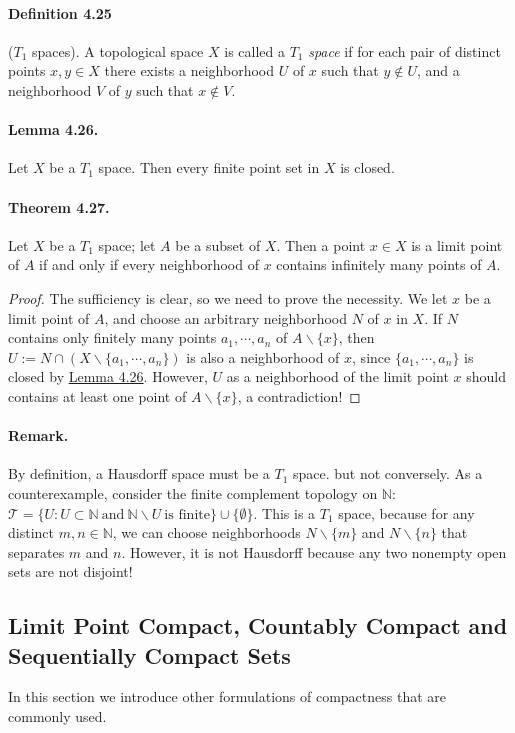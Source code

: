 \documentclass{article}
\numberwithin{equation}{section}
\theoremstyle{plain}
\theoremstyle{definition}
\begin{document}
\paragraph{Definition 4.25\label{def:4.25}} ($T_1$ spaces). A topological space $X$ is called a $T_1$ \textit{space} if for each pair of distinct points $x,y\in X$ there exists a neighborhood $U$ of $x$ such that $y\notin U$, and a neighborhood $V$ of $y$ such that $x\notin V$.
\paragraph{Lemma 4.26.\label{lemma:4.26}} Let $X$ be a $T_1$ space. Then every finite point set in $X$ is closed.
\paragraph{Theorem 4.27.\label{thm:4.27}} Let $X$ be a $T_1$ space; let $A$ be a subset of $X$. Then a point $x\in X$ is a limit point of $A$ if and only if every neighborhood of $x$ contains infinitely many points of $A$.
\begin{proof}
The sufficiency is clear, so we need to prove the necessity. We let $x$ be a limit point of $A$, and choose an arbitrary neighborhood $N$ of $x$ in $X$. If $N$ contains only finitely many points $a_1,\cdots,a_n$ of $A\backslash\{x\}$, then $U:=N\cap (X\backslash\{a_1,\cdots,a_n\})$ is also a neighborhood of $x$, since $\{a_1,\cdots,a_n\}$ is closed by \hyperref[lemma:4.26]{Lemma 4.26}. However, $U$ as a neighborhood of the limit point $x$ should contains at least one point of $A\backslash\{x\}$, a contradiction!
\end{proof}

\paragraph{Remark.} By definition, a Hausdorff space must be a $T_1$ space. but not conversely. As a counterexample, consider the finite complement topology on $\mathbb{N}$: $\mathscr{T}=\{U:U\subset\mathbb{N}\ \text{and}\ \mathbb{N}\backslash U\ \text{is finite}\}\cup\{\emptyset\}$. This is a $T_1$ space, because for any distinct $m,n\in\mathbb{N}$, we can choose neighborhoods $N\backslash\{m\}$ and $N\backslash\{n\}$ that separates $m$ and $n$. However, it is not Hausdorff because any two nonempty open sets are not disjoint!

\subsection{Limit Point Compact, Countably Compact and Sequentially Compact Sets}
In this section we introduce other formulations of compactness that are commonly used.
\end{document}
